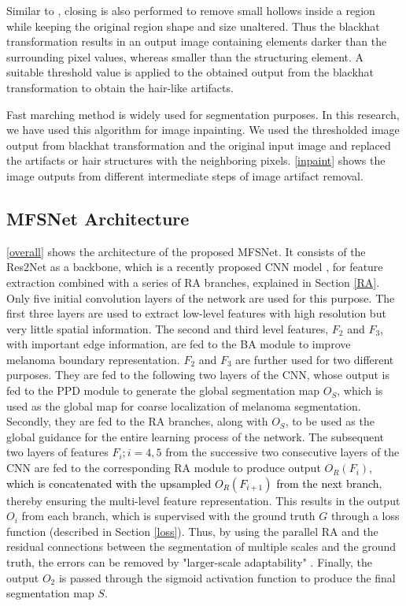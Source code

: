 \documentclass[review]{elsarticle}
\begin{document}
Similar to \cite{wang2014morphological}, closing is also performed to remove small hollows inside a region while keeping the original region shape and size unaltered. Thus the blackhat transformation results in an output image containing elements darker than the surrounding pixel values, whereas smaller than the structuring element. A suitable threshold value is applied to the obtained output from the blackhat transformation to obtain the hair-like artifacts. 

Fast marching method \cite{long2015fully} is widely used for segmentation purposes. In this research, we have used this algorithm for image inpainting. We used the thresholded image output from blackhat transformation and the original input image and replaced the artifacts or hair structures with the neighboring pixels. \autoref{inpaint} shows the image outputs from different intermediate steps of image artifact removal.



\subsection{MFSNet Architecture}\label{architecture}
\autoref{overall} shows the architecture of the proposed MFSNet. It consists of the Res2Net as a backbone, which is a recently proposed CNN model \cite{gao2019res2net}, for feature extraction combined with a series of RA branches, explained in Section \ref{RA}. Only five initial convolution layers of the network are used for this purpose. The first three layers are used to extract low-level features with high resolution but very little spatial information. The second and third level features, $F_2$ and $F_3$, with important edge information, are fed to the BA module to improve melanoma boundary representation. $F_2$ and $F_3$ are further used for two different purposes. They are fed to the following two layers of the CNN, whose output is fed to the PPD module to generate the global segmentation map $O_S$, which is used as the global map for coarse localization of melanoma segmentation. Secondly, they are fed to the RA branches, along with $O_S$, to be used as the global guidance for the entire learning process of the network. The subsequent two layers of features $F_i; i={4, 5}$ from the successive two consecutive layers of the CNN are fed to the corresponding RA module to produce output $O_R(F_i)$,\textcolor{black}{ which is concatenated with the upsampled $O_R(F_{i+1})$ from the next branch}, thereby ensuring the multi-level feature representation. This results in the output $O_i$ from each branch, which is supervised with the ground truth $G$ through a loss function (described in Section \ref{loss}). Thus, by using the parallel RA and the residual connections between the segmentation of multiple scales and the ground truth, the errors can be removed by "larger-scale adaptability" \cite{chen2018reverse}. Finally, the output $O_2$ is passed through the sigmoid activation function to produce the final segmentation map $S$. 
\end{document}
